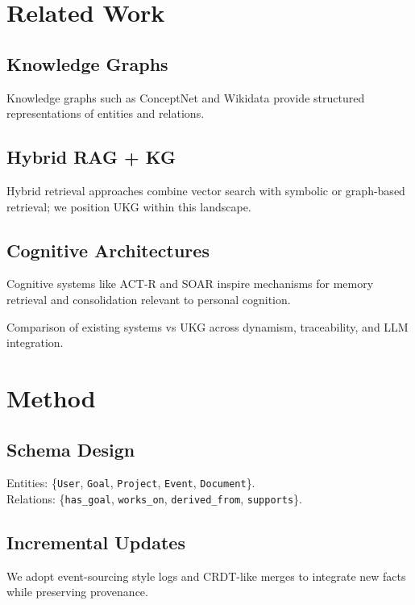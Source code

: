 \documentclass[10pt]{article}
\begin{document}
\section{Related Work}
\subsection{Knowledge Graphs}
Knowledge graphs such as ConceptNet and Wikidata provide structured representations of entities and relations.

\subsection{Hybrid RAG + KG}
Hybrid retrieval approaches combine vector search with symbolic or graph-based retrieval; we position UKG within this landscape.

\subsection{Cognitive Architectures}
Cognitive systems like ACT-R and SOAR inspire mechanisms for memory retrieval and consolidation relevant to personal cognition.

\begin{table}[t]
	\centering
	\caption{Comparison of existing systems vs UKG across dynamism, traceability, and LLM integration.}
	\label{tab:related-ukg}
	
\end{table}

\section{Method}
\subsection{Schema Design}
\label{subsec:schema}
Entities: \{\texttt{User}, \texttt{Goal}, \texttt{Project}, \texttt{Event}, \texttt{Document}\}.\\
Relations: \{\texttt{has\_goal}, \texttt{works\_on}, \texttt{derived\_from}, \texttt{supports}\}.


\subsection{Incremental Updates}
\label{subsec:updates}
We adopt event-sourcing style logs and CRDT-like merges to integrate new facts while preserving provenance.
\end{document}
